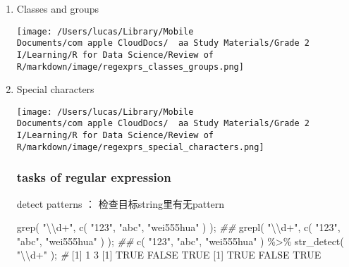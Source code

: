 \documentclass[
]{article}
\let\oldincludegraphics\includegraphics
\renewcommand{\includegraphics}[2][]{\begin{center}\oldincludegraphics[#1]{#2}\end{center}}
\newenvironment{Shaded}{}{}
\newcommand{\CommentTok}[1]{\textcolor[rgb]{0.38,0.63,0.69}{\textit{#1}}}
\newcommand{\ConstantTok}[1]{\textcolor[rgb]{0.53,0.00,0.00}{#1}}
\newcommand{\DecValTok}[1]{\textcolor[rgb]{0.25,0.63,0.44}{#1}}
\newcommand{\DocumentationTok}[1]{\textcolor[rgb]{0.73,0.13,0.13}{\textit{#1}}}
\newcommand{\FunctionTok}[1]{\textcolor[rgb]{0.02,0.16,0.49}{#1}}
\newcommand{\NormalTok}[1]{#1}
\newcommand{\SpecialCharTok}[1]{\textcolor[rgb]{0.25,0.44,0.63}{#1}}
\newcommand{\StringTok}[1]{\textcolor[rgb]{0.25,0.44,0.63}{#1}}
\begin{document}
\begin{enumerate}
\def\labelenumi{\arabic{enumi}.}
\item
  Classes and groups

  \texttt{[image: /Users/lucas/Library/Mobile Documents/com~apple~CloudDocs/~~aa Study Materials/Grade 2 I/Learning/R for Data Science/Review of R/markdown/image/regexprs\_classes\_groups.png]}
\item
  Special characters

  \texttt{[image: /Users/lucas/Library/Mobile Documents/com~apple~CloudDocs/~~aa Study Materials/Grade 2 I/Learning/R for Data Science/Review of R/markdown/image/regexprs\_special\_characters.png]}

  \hypertarget{tasks-of-regular-expression}{%
  \subsubsection{\texorpdfstring{tasks of regular expression
  }{tasks of regular expression }}\label{tasks-of-regular-expression}}

  detect patterns ： 检查目标string里有无pattern

\begin{Shaded}
\begin{Highlighting}[]
\FunctionTok{grep}\NormalTok{( }\StringTok{"}\SpecialCharTok{\textbackslash{}\textbackslash{}}\StringTok{d+"}\NormalTok{, }\FunctionTok{c}\NormalTok{( }\StringTok{"123"}\NormalTok{, }\StringTok{"abc"}\NormalTok{, }\StringTok{"wei555hua"}\NormalTok{ ) ); }\DocumentationTok{\#\# }
\FunctionTok{grepl}\NormalTok{( }\StringTok{"}\SpecialCharTok{\textbackslash{}\textbackslash{}}\StringTok{d+"}\NormalTok{, }\FunctionTok{c}\NormalTok{( }\StringTok{"123"}\NormalTok{, }\StringTok{"abc"}\NormalTok{, }\StringTok{"wei555hua"}\NormalTok{ ) ); }\DocumentationTok{\#\# }
\FunctionTok{c}\NormalTok{( }\StringTok{"123"}\NormalTok{, }\StringTok{"abc"}\NormalTok{, }\StringTok{"wei555hua"}\NormalTok{ ) }\SpecialCharTok{\%\textgreater{}\%} \FunctionTok{str\_detect}\NormalTok{( }\StringTok{"}\SpecialCharTok{\textbackslash{}\textbackslash{}}\StringTok{d+"}\NormalTok{ );}
\CommentTok{\#}
\NormalTok{[}\DecValTok{1}\NormalTok{] }\DecValTok{1} \DecValTok{3}
\NormalTok{[}\DecValTok{1}\NormalTok{]  }\ConstantTok{TRUE} \ConstantTok{FALSE}  \ConstantTok{TRUE}
\NormalTok{[}\DecValTok{1}\NormalTok{]  }\ConstantTok{TRUE} \ConstantTok{FALSE}  \ConstantTok{TRUE}
\end{Highlighting}
\end{Shaded}


\end{enumerate}
\end{document}

